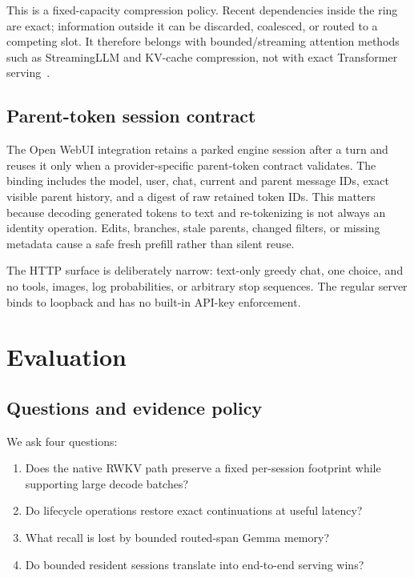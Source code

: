 \documentclass[10pt,letterpaper]{article}
\begin{document}
This is a fixed-capacity compression policy.  Recent dependencies inside the
ring are exact; information outside it can be discarded, coalesced, or routed
to a competing slot.  It therefore belongs with bounded/streaming attention
methods such as StreamingLLM and KV-cache compression, not with exact
Transformer serving~\cite{streamingllm,snapkv}.

\subsection{Parent-token session contract}

The Open WebUI integration retains a parked engine session after a turn and
reuses it only when a provider-specific parent-token contract validates.  The
binding includes the model, user, chat, current and parent message IDs, exact
visible parent history, and a digest of raw retained token IDs.  This matters
because decoding generated tokens to text and re-tokenizing is not always an
identity operation.  Edits, branches, stale parents, changed filters, or
missing metadata cause a safe fresh prefill rather than silent reuse.

The HTTP surface is deliberately narrow: text-only greedy chat, one choice,
and no tools, images, log probabilities, or arbitrary stop sequences.  The
regular server binds to loopback and has no built-in API-key enforcement.

\section{Evaluation}

\subsection{Questions and evidence policy}

We ask four questions:

\begin{enumerate}
  \item[\textbf{Q1.}] Does the native RWKV path preserve a fixed per-session footprint while
  supporting large decode batches?
  \item[\textbf{Q2.}] Do lifecycle operations restore exact continuations at useful latency?
  \item[\textbf{Q3.}] What recall is lost by bounded routed-span Gemma memory?
  \item[\textbf{Q4.}] Do bounded resident sessions translate into end-to-end serving wins?
\end{enumerate}
\end{document}
